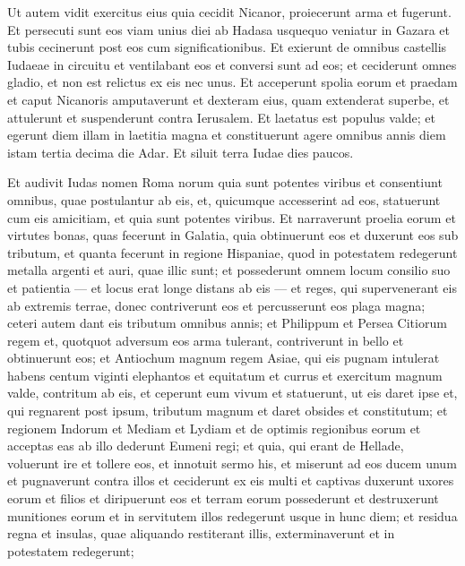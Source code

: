 \begin{biblechapter}
\begin{biblechapter}
\begin{biblechapter}
\begin{biblechapter}
\begin{biblechapter}
\begin{biblechapter}
\begin{biblechapter}
\verse Ut autem vidit exercitus eius quia cecidit Nicanor, proiecerunt arma et fugerunt. 
\verse Et persecuti sunt eos viam unius diei ab Hadasa usquequo veniatur in Gazara et tubis cecinerunt post eos cum significationibus. 
\verse Et exierunt de omnibus castellis Iudaeae in circuitu et ventilabant eos et conversi sunt ad eos; et ceciderunt omnes gladio, et non est relictus ex eis nec unus. 
\verse Et acceperunt spolia eorum et praedam et caput Nicanoris amputaverunt et dexteram eius, quam extenderat superbe, et attulerunt et suspenderunt contra Ierusalem. 
 \verse Et laetatus est populus valde; et egerunt diem illam in laetitia magna 
\verse et constituerunt agere omnibus annis diem istam tertia decima die Adar. 
\verse Et siluit terra Iudae dies paucos.
 
\begin{biblechapter}
\verse Et audivit Iudas nomen Roma norum quia sunt potentes viribus et consentiunt omnibus, quae postulantur ab eis, et, quicumque accesserint ad eos, statuerunt cum eis amicitiam, 
\verse et quia sunt potentes viribus. Et narraverunt proelia eorum et virtutes bonas, quas fecerunt in Galatia, quia obtinuerunt eos et duxerunt eos sub tributum, 
\verse et quanta fecerunt in regione Hispaniae, quod in potestatem redegerunt metalla argenti et auri, quae illic sunt; 
\verse et possederunt omnem locum consilio suo et patientia — et locus erat longe distans ab eis — et reges, qui supervenerant eis ab extremis terrae, donec contriverunt eos et percusserunt eos plaga magna; ceteri autem dant eis tributum omnibus annis; 
\verse et Philippum et Persea Citiorum regem et, quotquot adversum eos arma tulerant, contriverunt in bello et obtinuerunt eos; 
 \verse et Antiochum magnum regem Asiae, qui eis pugnam intulerat habens centum viginti elephantos et equitatum et currus et exercitum magnum valde, contritum ab eis, 
\verse et ceperunt eum vivum et statuerunt, ut eis daret ipse et, qui regnarent post ipsum, tributum magnum et daret obsides et constitutum; 
\verse et regionem Indorum et Mediam et Lydiam et de optimis regionibus eorum et acceptas eas ab illo dederunt Eumeni regi; 
\verse et quia, qui erant de Hellade, voluerunt ire et tollere eos, et innotuit sermo his, 
\verse et miserunt ad eos ducem unum et pugnaverunt contra illos et ceciderunt ex eis multi et captivas duxerunt uxores eorum et filios et diripuerunt eos et terram eorum possederunt et destruxerunt munitiones eorum et in servitutem illos redegerunt usque in hunc diem; 
\verse et residua regna et insulas, quae aliquando restiterant illis, exterminaverunt et in potestatem redegerunt; 

\end{biblechapter}
\end{biblechapter}
\end{biblechapter}
\end{biblechapter}
\end{biblechapter}
\end{biblechapter}
\end{biblechapter}
\end{biblechapter}
